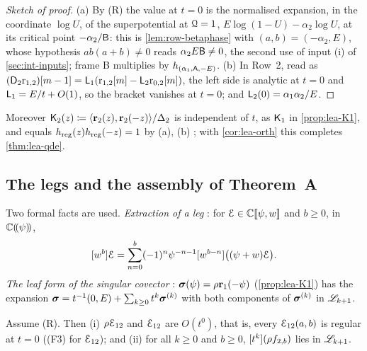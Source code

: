 \begin{proof}[Sketch of proof]
(a) By (R) the value at $t=0$ is the normalised expansion, in the coordinate $\log U$, of the superpotential at $\mathcal{Q}=1$, $E\log(1-U)-\alpha_2\log U$, at its critical point $-\alpha_2/\mathsf{B}$: this is \cref{lem:row-betaphase} with $(a,b)=(-\alpha_2,E)$, whose hypothesis $ab(a+b)\neq0$ reads $\alpha_2E\mathsf{B}\neq0$, the second use of input (i) of \cref{sec:int-inputs}; frame B multiplies by $h_{(\alpha_1,\mathsf{A},-E)}$. (b) In Row~2, read as $(\mathsf{D}_2\mathrm{r}_{1,2})[m-1]=\mathsf{L}_1(\mathrm{r}_{1,2}[m]-\mathsf{L}_2\mathrm{r}_{0,2}[m])$, the left side is analytic at $t=0$ and $\mathsf{L}_1=E/t+O(1)$, so the bracket vanishes at $t=0$; and $\mathsf{L}_2(0)=\alpha_1\alpha_2/E$.
\end{proof}

Moreover $\mathsf{K}_{2}(z)\coloneqq\langle\mathbf{r}_2(z),\mathbf{r}_2(-z)\rangle/\Delta_2$ is independent of $t$, as $\mathsf{K}_{1}$ in \cref{prop:lea-K1}, and equals $h_{\mathrm{reg}}(z)h_{\mathrm{reg}}(-z)=1$ by (a), (b) ; with \cref{cor:lea-orth} this completes \cref{thm:lea-qde}.

\subsection{The legs and the assembly of Theorem~A}
\label{sec:lea-legs}

Two formal facts are used. \emph{Extraction of a leg} : for $\mathcal{E}\in\mathbb{C}[\![ \psi,w ]\!]$ and $b\geq0$, in $\mathbb{C}(\!(\psi)\!)$,
\begin{equation}
\label{eq:lea-legext}
[w^b]\mathcal{E}=\sum_{n=0}^{b}(-1)^n\psi^{-n-1}[w^{b-n}]\big((\psi+w)\mathcal{E}\big).
\end{equation}
\emph{The leaf form of the singular covector} : $\boldsymbol{\sigma}(\psi)=\rho\mathbf{r}_1(-\psi)$ (\cref{prop:lea-K1}) has the expansion $\boldsymbol{\sigma}=t^{-1}(0,E)+\sum_{k\geq0}t^k\boldsymbol{\sigma}^{(k)}$ with both components of $\boldsymbol{\sigma}^{(k)}$ in $\mathscr{L}_{k+1}$.

\begin{prop}[{\Lref{Proposition~4.32}: (L2) for $j=2$ and the regularity of $\Edge_{12}$}]
\label{prop:lea-L2}
Assume \textup{(R)}. Then \textup{(i)} $\rho\mathcal{E}_{12}$ and $\Edge_{12}$ are $O(t^0)$, that is, every $\mathcal{E}_{12}(a,b)$ is regular at $t=0$ ((F3) for $\Edge_{12}$); and \textup{(ii)} for all $k\geq0$ and $b\geq0$, $[t^k](\rho f_{2,b})$ lies in $\mathscr{L}_{k+1}$.
\end{prop}

